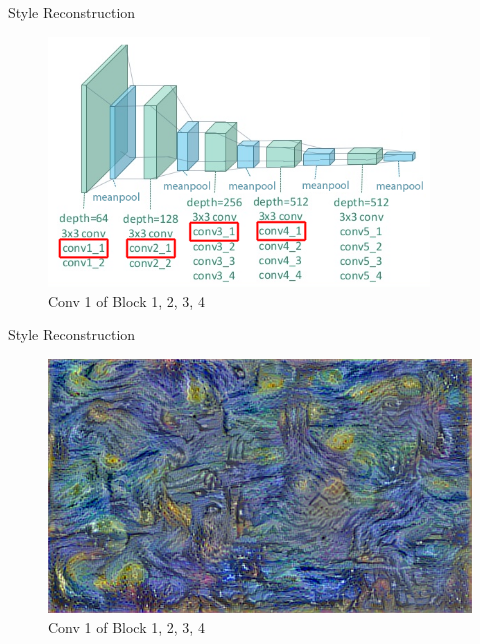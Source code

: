\documentclass{beamer}
\begin{document}
\begin{frame}{Style Reconstruction}
\begin{figure}[ht]
\centering
\caption*{Conv 1 of Block 1, 2, 3, 4}
\includegraphics[width=0.9\textwidth]{img/vgg19/style/block4_conv1}
\end{figure}
\end{frame}
\begin{frame}{Style Reconstruction}
\begin{figure}[ht]
\centering
\caption*{Conv 1 of Block 1, 2, 3, 4}
\includegraphics[width=\textwidth]{img/style/block4_conv1.png}
\end{figure}
\end{frame}
\end{document}
